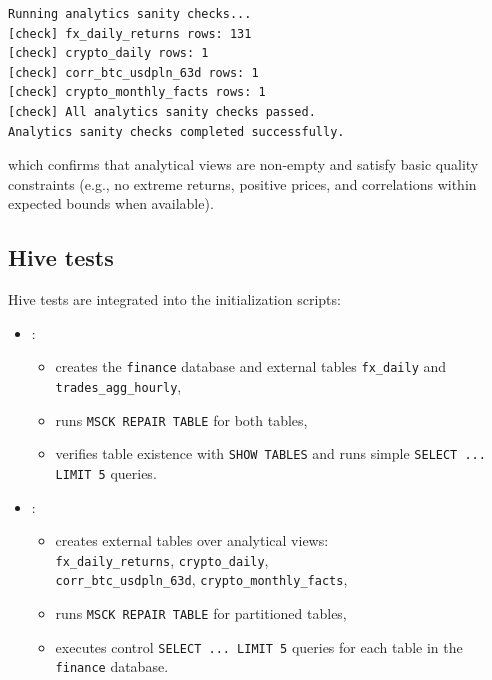 \documentclass{article}
\begin{document}
\begin{lstlisting}
Running analytics sanity checks...
[check] fx_daily_returns rows: 131
[check] crypto_daily rows: 1
[check] corr_btc_usdpln_63d rows: 1
[check] crypto_monthly_facts rows: 1
[check] All analytics sanity checks passed.
Analytics sanity checks completed successfully.
\end{lstlisting}

which confirms that analytical views are non-empty and satisfy basic
quality constraints (e.g., no extreme returns, positive prices, and
correlations within expected bounds when available).

\subsection{Hive tests}

Hive tests are integrated into the initialization scripts:

\begin{itemize}
\item
  :

  \begin{itemize}
    \item
    creates the \texttt{finance} database and external tables
    \texttt{fx\_daily} and \texttt{trades\_agg\_hourly},
  \item
    runs \texttt{MSCK REPAIR TABLE} for both tables,
  \item
    verifies table existence with \texttt{SHOW TABLES} and runs simple
    \texttt{SELECT ... LIMIT 5} queries.
  \end{itemize}
\item
  :

  \begin{itemize}
    \item
    creates external tables over analytical views:\\
    \texttt{fx\_daily\_returns}, \texttt{crypto\_daily},\\
    \texttt{corr\_btc\_usdpln\_63d}, \texttt{crypto\_monthly\_facts},
  \item
    runs \texttt{MSCK REPAIR TABLE} for partitioned tables,
  \item
    executes control \texttt{SELECT ... LIMIT 5} queries for each table
    in the \texttt{finance} database.
  \end{itemize}
\end{itemize}
\end{document}
